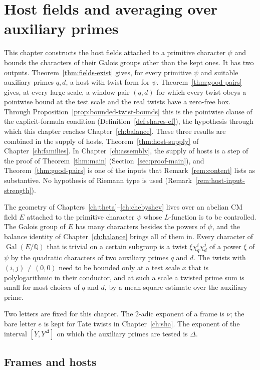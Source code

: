 \documentclass[11pt]{amsbook}
\theoremstyle{plain}
\theoremstyle{definition}
\theoremstyle{remark}
\numberwithin{equation}{section}
\numberwithin{figure}{chapter}
\numberwithin{table}{chapter}
\newcommand{\Q}{\mathbb{Q}}
\newcommand{\Gal}{\operatorname{Gal}}
\begin{document}
\chapter{Host fields and averaging over auxiliary primes}
\label{ch:hosts}\label{sec:hosts}

This chapter constructs the host fields attached to a primitive
character $\psi$ and bounds the characters of their Galois groups
other than the kept ones. It has two outputs.
Theorem~\ref{thm:fields-exist} gives, for every primitive $\psi$ and
suitable auxiliary primes $q,d$, a host with twist form for $\psi$.
Theorem~\ref{thm:good-pairs} gives, at every large scale, a window
pair $(q,d)$ for which every twist obeys a pointwise bound at the
test scale and the real twists have a zero-free box. Through
Proposition~\ref{prop:bounded-twist-bounds} this is the pointwise
clause of the explicit-formula condition
(Definition~\ref{def:shares-ef}), the hypothesis through which this
chapter reaches Chapter~\ref{ch:balance}. These three results are
combined in the supply of hosts, Theorem~\ref{thm:host-supply} of
Chapter~\ref{ch:families}. In Chapter~\ref{ch:assembly}, the supply
of hosts is a step of the proof of Theorem~\ref{thm:main}
(Section~\ref{sec:proof-main}), and Theorem~\ref{thm:good-pairs} is
one of the inputs that Remark~\ref{rem:content} lists as
substantive. No hypothesis of Riemann type is used
(Remark~\ref{rem:host-input-strength}).

The geometry of Chapters~\ref{ch:theta}--\ref{ch:chebyshev} lives over
an abelian CM field $E$ attached to the primitive character $\psi$
whose $L$-function is to be controlled. The Galois group of $E$ has
many characters besides the powers of $\psi$, and the balance identity
of Chapter~\ref{ch:balance} brings all of them in. Every character
of $\Gal(E/\Q)$ that is trivial on a certain subgroup is a twist
$\xi\chi_q^i\chi_d^j$ of a power $\xi$ of $\psi$ by the quadratic
characters of two auxiliary primes $q$ and $d$. The twists with
$(i,j)\ne(0,0)$ need to be bounded only at a test scale $x$ that is
polylogarithmic in their conductor, and at such a scale a twisted
prime sum is small for most choices of $q$ and $d$, by a mean-square
estimate over the auxiliary prime.

Two letters are fixed for this chapter. The $2$-adic exponent of a
frame is $\nu$; the bare letter $e$ is kept for Tate twists in
Chapter~\ref{ch:sha}. The exponent of the interval $[Y,Y^\Delta]$ on
which the auxiliary primes are tested is $\Delta$.

\section{Frames and hosts}
\end{document}
